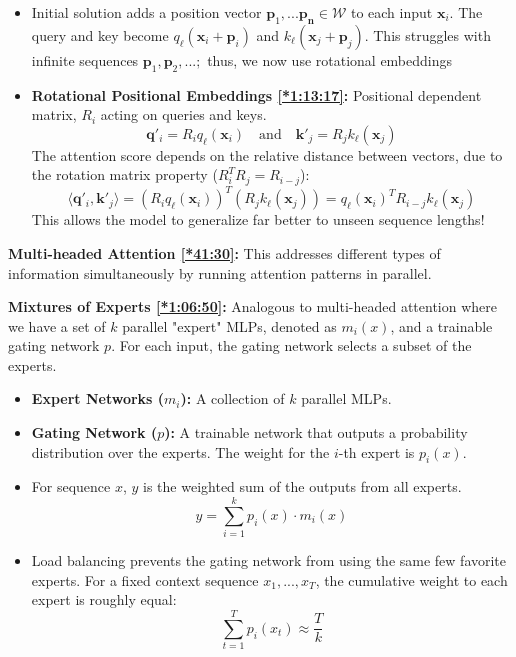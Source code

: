 \documentclass[12pt, twoside]{article}
\begin{document}
\begin{itemize}
    \item Initial solution adds a position vector $\mathbf{p}_1,...\mathbf{p_n} \in \mathcal{W}$ to each input $\mathbf{x}_i$. The query and key become $q_\ell(\mathbf{x}_i + \mathbf{p}_i)$ and $k_\ell(\mathbf{x}_j + \mathbf{p}_j)$. This struggles with infinite sequences $\textbf{p}_1,\textbf{p}_2,...;$ thus, we now use rotational embeddings
    \item \textbf{Rotational Positional Embeddings \href{https://youtu.be/1u6h3Nm3NvM?si=uJFx5andJnolQajy&t=4397}{[*1:13:17]}:} Positional dependent matrix, $R_i$ acting on queries and keys.
\[
\mathbf{q}'_i = R_i q_\ell(\mathbf{x}_i) \quad \text{and} \quad \mathbf{k}'_j = R_j k_\ell(\mathbf{x}_j)
\]
The attention score depends on the relative distance between vectors, due to the rotation matrix property ($R_i^T R_j = R_{i-j}$):
\[
\langle \mathbf{q}'_i, \mathbf{k}'_j \rangle = (R_i q_\ell(\mathbf{x}_i))^T (R_j k_\ell(\mathbf{x}_j)) = q_\ell(\mathbf{x}_i)^T R_{i-j} k_\ell(\mathbf{x}_j)
\]
This allows the model to generalize far better to unseen sequence lengths!

\end{itemize}



\textbf{Multi-headed Attention \href{https://youtu.be/1u6h3Nm3NvM?si=8XEsgSeUe-450EJZ&t=2490}{[*41:30]}:} This addresses different types of information simultaneously by running attention patterns in parallel.

\textbf{Mixtures of Experts \href{https://youtu.be/1u6h3Nm3NvM?si=n3l9F7Tf5RbvhOU4&t=4010}{[*1:06:50]}:} Analogous to multi-headed attention where we have a set of $k$ parallel "expert" MLPs, denoted as $m_i(x)$, and a trainable gating network $p$. For each input, the gating network selects a subset of the experts.

\begin{itemize}
    \item \textbf{Expert Networks ($m_i$):} A collection of $k$ parallel MLPs.
    \item \textbf{Gating Network ($p$):} A trainable network that outputs a probability distribution over the experts. The weight for the $i$-th expert is $p_i(x)$.
    \item For sequence $x$, $y$ is the weighted sum of the outputs from all experts.
$$ y = \sum_{i=1}^{k} p_i(x) \cdot m_i(x)$$
    \item Load balancing prevents the gating network from  using the same few favorite experts. For a fixed context sequence $x_1,...,x_T$, the cumulative weight to each expert is roughly equal:
$$ \sum_{t=1}^{T} p_i(x_t) \approx \frac{T}{k} $$
\end{itemize}
\end{document}
